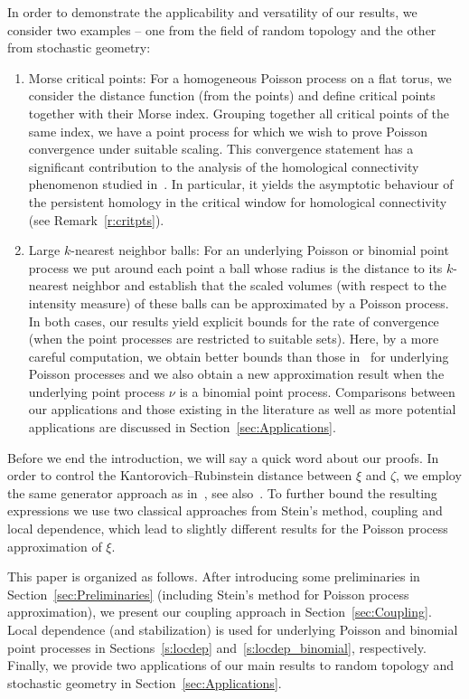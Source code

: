 \documentclass[10pt]{amsart}
\theoremstyle{definition}\newtheorem{defi}[theo]{Definition}\newtheorem{rema}[theo]{Remark}\newtheorem{exam}[theo]{Example}\newtheorem{exem}[theo]{Example}\newtheorem{nota}[theo]{Notation}
\begin{document}
In order to demonstrate the applicability and versatility of our results, we consider two examples -- one from the field of random topology and the other from stochastic geometry:
\begin{enumerate}
\item Morse critical points: For a homogeneous Poisson process on a flat torus, we consider the distance function (from the points) and define critical points together with their Morse index. Grouping together all critical points of the same index, we have a point process for which we wish to prove Poisson convergence under suitable scaling. This convergence statement has a significant contribution to the analysis of the homological connectivity phenomenon studied in~\cite{Bobrowski2019}. In particular, it yields the asymptotic behaviour of the persistent homology in the critical window for homological connectivity (see Remark~\ref{r:critpts}).

\item Large $k$-nearest neighbor balls: For an underlying Poisson or binomial point process we put around each point a ball whose radius is the distance to its $k$-nearest neighbor and establish that {the scaled volumes (with respect to the intensity measure)} of these balls can be approximated by a Poisson process. In both cases, our results yield explicit bounds for the rate of convergence (when the point processes are restricted to suitable sets). Here, by a more careful computation, we obtain better bounds than those in~\cite[Theorem~4.2]{Otto2020} for {underlying Poisson processes} and we also obtain a new approximation result when the underlying point process $\nu$ is a {binomial} point process. Comparisons between our applications and those existing in the literature as well as more potential applications are discussed in Section~\ref{sec:Applications}.
\end{enumerate}

Before we end the introduction, we will say a quick word about our proofs. In order to control the Kantorovich--Rubinstein distance between $\xi$ and $\zeta$, we employ the same generator approach as in~\cite{decreusefond_functional_2016}, see also~\cite{Barbour1992}. To further bound the resulting expressions we use two classical approaches from Stein's method, coupling and local dependence, which lead to slightly different results for the Poisson process approximation of $\xi$.

This paper is organized as follows. After introducing some preliminaries in Section~\ref{sec:Preliminaries} (including Stein's method for Poisson process approximation), we present our coupling approach in Section~\ref{sec:Coupling}. Local dependence (and stabilization) is used for underlying Poisson and binomial point processes in Sections~\ref{s:locdep} and~\ref{s:locdep_binomial}, respectively. Finally, we provide two applications of our main results to {random topology and} stochastic geometry in Section~\ref{sec:Applications}.
\end{document}

